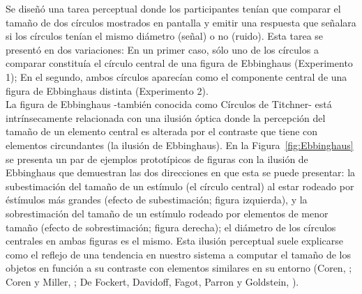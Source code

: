 Se diseñó una tarea perceptual donde los participantes tenían que comparar el tamaño de dos círculos mostrados en pantalla y emitir una respuesta que señalara si los círculos tenían el mismo diámetro (señal) o no (ruido). Esta tarea se presentó en dos variaciones: En un primer caso, sólo uno de los círculos a comparar constituía el círculo central de una figura de Ebbinghaus (Experimento 1); En el segundo, ambos círculos aparecían como el componente central de una figura de Ebbinghaus distinta (Experimento 2).\\ 

La figura de Ebbinghaus -también conocida como Círculos de Titchner- está intrínsecamente relacionada con una ilusión óptica donde la percepción del tamaño de un elemento central es alterada por el contraste que tiene con elementos circundantes (la ilusión de Ebbinghaus). En la Figura~\ref{fig:Ebbinghaus} se presenta un par de ejemplos prototípicos de figuras con la ilusión de Ebbinghaus que demuestran las dos direcciones en que esta se puede presentar: la subestimación del tamaño de un estímulo (el círculo central) al estar rodeado por éstímulos más grandes (efecto de subestimación; figura izquierda), y la sobrestimación del tamaño de un estímulo rodeado por elementos de menor tamaño (efecto de sobrestimación; figura derecha); el diámetro de los círculos centrales en ambas figuras es el mismo. Esta ilusión perceptual suele explicarse como el reflejo de una tendencia en nuestro sistema a computar el tamaño de los objetos en función a su contraste con elementos similares en su entorno (Coren, \citeyear{Coren1971}; Coren y Miller, \citeyear{Coren1974}; De Fockert, Davidoff, Fagot, Parron y Goldstein, \citeyear{Fockert2007}).\\

